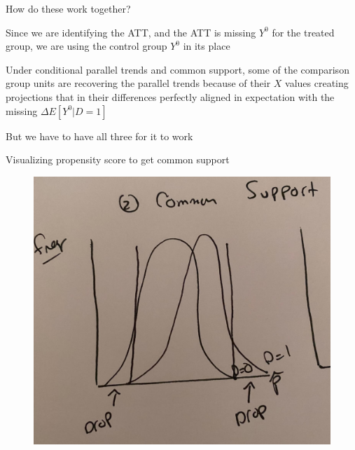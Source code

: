 \documentclass{beamer}
\begin{document}
\begin{frame}{How do these work together?}

Since we are identifying the ATT, and the ATT is missing $Y^0$ for the treated group, we are using the control group $Y^0$ in its place

\bigskip

Under conditional parallel trends and common support, some of the comparison group units are recovering the parallel trends because of their $X$ values creating projections that in their differences perfectly aligned in expectation with the missing $\Delta E[Y^0|D=1]$

\bigskip

But we have to have all three for it to work

\end{frame}

\begin{frame}{Visualizing propensity score to get common support}

	\begin{figure}
	\includegraphics[scale=0.05]{./lecture_includes/common_support_abadie.jpg}
	\end{figure}

\end{frame}
\end{document}
